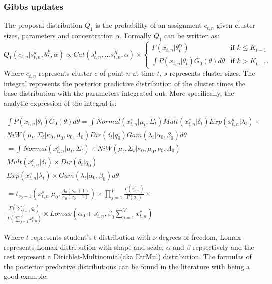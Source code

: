 \documentclass[twoside,hidelinks]{article}
\begin{document}
\subsubsection{Gibbs updates}
\label{gibbsUpd}
The proposal distribution $Q_1$ is the probability of an assignment $c_{t,n}$ given cluster sizes, parameters and concentration $\alpha$. Formally $Q_1$ can be written as:
\begin{equation} \label{Gibbs}
 Q_1(c_{t,n} | s_{t,n}^k, \theta_t^k, \alpha) \propto Cat( s_{t,n}^1,...s_{t,n}^K, \alpha ) \times
 	\begin{cases} 
 	F(x_{t,n} | \theta_t^{c_t} )  &\mbox{if } k \leq K_{t-1} \\
 	\int P(x_{t,n} | \theta_t )G_0(\theta) d\theta & \mbox{if } k > K_{t-1}. \end{cases}
\end{equation}
Where $c_{t,n}$ represents cluster $c$ of point $n$ at time $t$, $s$ represents cluster sizes. The integral represents the posterior predictive distribution of the cluster times the base distribution with the parameters integrated out. More specifically, the analytic expression of the integral is:


\begin{equation} \label{Q1}
	\begin{split}
		 	\int P(x_{t,n} | \theta_t )G_0(\theta) d\theta =
		 	\int Normal(x_{t,n}^s| \mu_t, \Sigma_t) Mult(x_{t,n}^c | \delta_t) Exp(x_{t,n}^a | \lambda_t) \times  \\ NiW( \mu_t, \Sigma_t | \kappa_0, \mu_0, \nu_0, \Lambda_0 ) Dir(\delta_t | q_0) Gam( \lambda_t | \alpha_0, \beta_0)  d\theta  \\
			= \int Normal(x_{t,n}^s| \mu_t, \Sigma_t) \times NiW( \mu_t, \Sigma_t | \kappa_0, \mu_0, \nu_0, \Lambda_0 )\\
			 Mult(x_{t,n}^c | \delta_t) \times Dir(\delta_t | q_0) \\
			 Exp(x_{t,n}^a | \lambda_t) \times Gam( \lambda_t | \alpha_0, \beta_0)  d\theta  \\
		 	= t_{\nu_0-1}( x_{t,n}^s | \mu_0, \frac{\Lambda_0(\kappa_0+1)}{\kappa_0(\nu_0-1)}) \times \prod_{j=1}^V \frac{\Gamma(x_{t,n}^c)}{\Gamma(q_0)} \times \\ \frac{\Gamma(\sum_{j=1}^V q_0)}{\Gamma(\sum_{j=1}^V x_{t,n}^c)} \times Lomax(\alpha_0 + s_{t,n}^c, \beta_0 \sum_{j=1}^V x_{t,n}^c)
 	\end{split}
\end{equation}

Where $t$ represents student's t-distribution with $\nu$ degrees of freedom, Lomax represents Lomax distribution with shape and scale, $\alpha$ and $\beta$ repsectively and the rest represent a Dirichlet-Multinomial(aka DirMul) distribution. The formulas of the posterior predictive distributions can be found in the literature with \cite{compendium} being a good example. 
\end{document}
